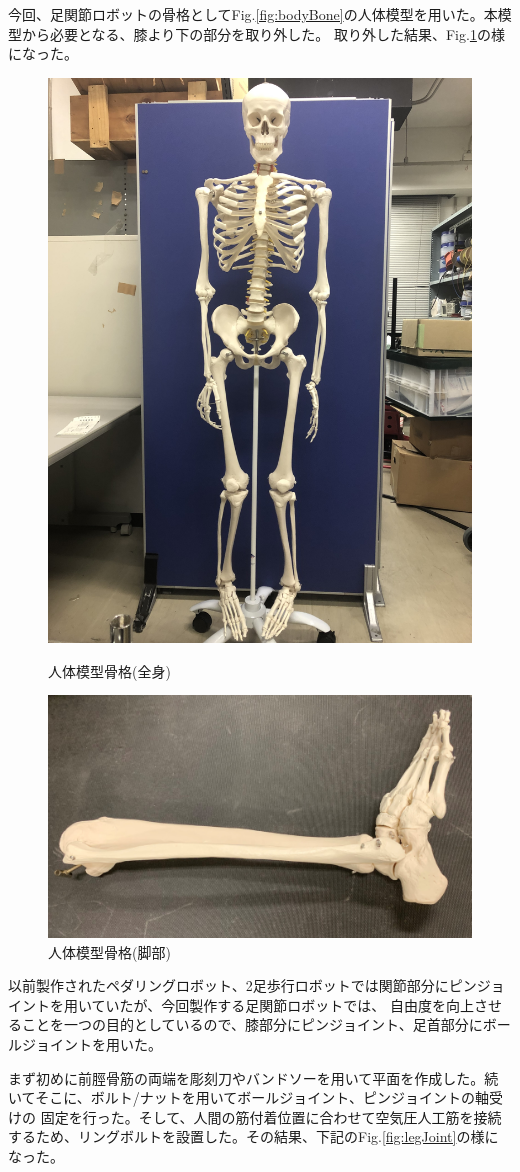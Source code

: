 今回、足関節ロボットの骨格としてFig.\ref{fig:bodyBone}の人体模型を用いた。本模型から必要となる、膝より下の部分を取り外した。
取り外した結果、Fig.\ref{fig:legBone}の様になった。
\begin{figure}[h]
    \begin{center}
     \includegraphics[width=0.4\columnwidth,clip]{./2_measurement/bodyBone.eps}
     \caption{人体模型骨格(全身)}
     \label{fig:bodyBone}
    \end{center}
    \begin{center}
     \includegraphics[width=0.6\columnwidth,clip]{./2_measurement/legBone.eps}
     \caption{人体模型骨格(脚部)}
     \label{fig:legBone}
    \end{center}
\end{figure}
\newpage
以前製作されたペダリングロボット、2足歩行ロボットでは関節部分にピンジョイントを用いていたが、今回製作する足関節ロボットでは、
自由度を向上させることを一つの目的としているので、膝部分にピンジョイント、足首部分にボールジョイントを用いた。

まず初めに前脛骨筋の両端を彫刻刀やバンドソーを用いて平面を作成した。続いてそこに、ボルト/ナットを用いてボールジョイント、ピンジョイントの軸受けの
固定を行った。そして、人間の筋付着位置に合わせて空気圧人工筋を接続するため、リングボルトを設置した。その結果、下記のFig.\ref{fig:legJoint}の様になった。

